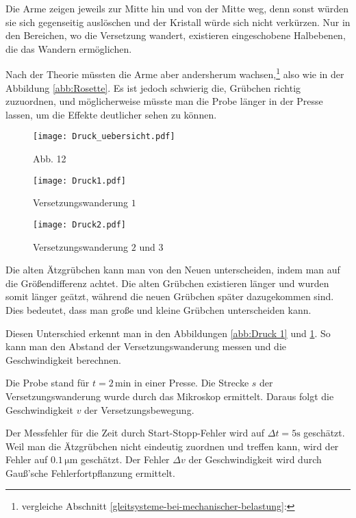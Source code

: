 \documentclass[12pt,a4paper]{scrartcl}
\numberwithin{equation}{section} %
\renewcommand{\[}{} %
\renewcommand{\]}{\noindent} %
\begin{document}
Die Arme zeigen jeweils zur Mitte hin und von der Mitte weg, denn sonst
würden sie sich gegenseitig auslöschen und der Kristall würde sich nicht
verkürzen. Nur in den Bereichen, wo die Versetzung wandert, existieren
eingeschobene Halbebenen, die das Wandern ermöglichen.

Nach der Theorie müssten die Arme aber andersherum wachsen,\footnote{vergleiche Abschnitt \ref{gleitsysteme-bei-mechanischer-belastung}: } also wie in
der Abbildung \ref{abb:Rosette}. Es ist jedoch schwierig die, Grübchen richtig
zuzuordnen, und möglicherweise müsste man die Probe länger in der Presse
lassen, um die Effekte deutlicher sehen zu können.

\begin{figure}[ht]
	\begin{minipage}[t]{\linewidth}
		\centering
		\texttt{[image: Druck\_uebersicht.pdf]}
		\caption{Abb. 12}
		\label{abb:Druck all}
	\end{minipage}
	
	\vspace{8pt}
	\begin{minipage}[t]{.5\linewidth}
		\texttt{[image: Druck1.pdf]}
		\caption{Versetzungswanderung $1$}
		\label{abb:Druck 1}
	\end{minipage}
	\begin{minipage}[t]{.5\linewidth}
		\texttt{[image: Druck2.pdf]}
		\caption{Versetzungswanderung $2$ und $3$}
		\label{abb:Druck 2}
	\end{minipage}
\end{figure}

Die alten Ätzgrübchen kann man von den Neuen unterscheiden, indem man auf die Größendifferenz achtet. Die alten Grübchen existieren länger und wurden somit länger geätzt, während die neuen Grübchen später dazugekommen sind. Dies bedeutet, dass man große und kleine Grübchen unterscheiden kann.

Diesen Unterschied erkennt man in den Abbildungen \ref{abb:Druck 1} und \ref{abb:Druck 2}. So kann man den Abstand der Versetzungswanderung messen und die Geschwindigkeit berechnen.

Die Probe stand für \(t=2\mathrm{\,min}\) in einer Presse. Die Strecke
\(s\) der Versetzungswanderung wurde durch das Mikroskop ermittelt.
Daraus folgt die Geschwindigkeit \(v\) der Versetzungsbewegung.

Der Messfehler für die Zeit durch Start-Stopp-Fehler wird auf
\(\Delta t=5\mathrm s\) geschätzt. Weil man die Ätzgrübchen nicht
eindeutig zuordnen und treffen kann, wird der Fehler auf
\(0.1\mathrm{\,\mu m}\) geschätzt. Der Fehler \(\Delta v\) der
Geschwindigkeit wird durch Gauß'sche Fehlerfortpflanzung ermittelt.
\end{document}
